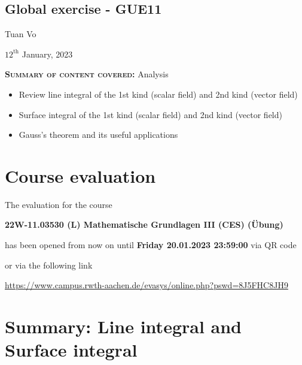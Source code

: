 \documentclass[12pt]{article}
\begin{document}
\begin{center}
	\section*{Global exercise - GUE11}
\end{center}
\begin{center}
	Tuan Vo
\end{center}
\begin{center}
	$12^{\text{th}}$ January, 2023
\end{center}
\textbf{\textsc{Summary of content covered:}} Analysis
\begin{itemize}
	\item Review line integral of the 1st kind (scalar field) and 2nd kind (vector field)
	\item Surface integral of the 1st kind (scalar field) and 2nd kind (vector field)
	\item Gauss's theorem and its useful applications
\end{itemize}
\section{Course evaluation}

The evaluation for the course

\begin{center}
	\textbf{22W-11.03530 (L) Mathematische Grundlagen III (CES) (Übung)}
\end{center}

has been opened from now on until \textbf{Friday 20.01.2023 23:59:00}
via QR code 


or via the following link 

\url{https://www.campus.rwth-aachen.de/evasys/online.php?pswd=8J5FHC8JH9}

\clearpage
\section{Summary: Line integral and Surface integral}
\end{document}
